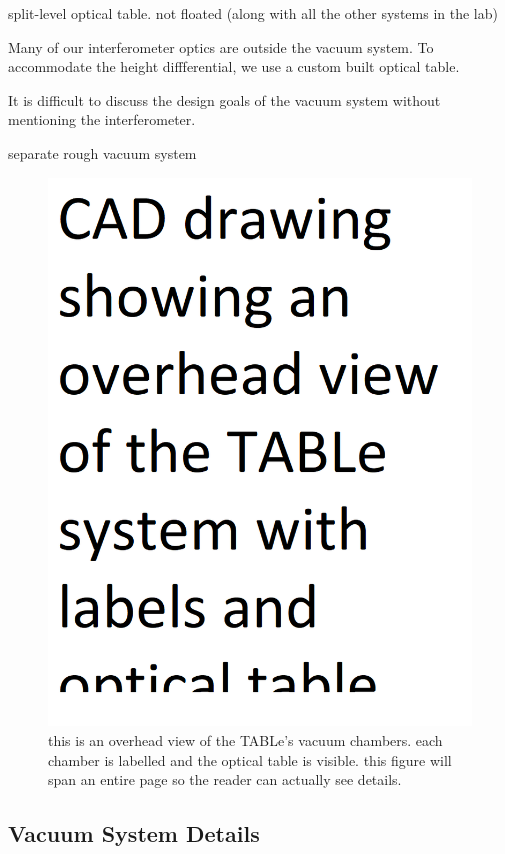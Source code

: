 split-level optical table. not floated (along with all the other systems in the lab)

Many of our interferometer optics are outside the vacuum system. To accommodate the height diffferential, we use a custom built optical table.

It is difficult to discuss the design goals of the vacuum system without mentioning the interferometer.


separate rough vacuum system 

\begin{figure}
	\centering
	\includegraphics[width=1.0\textwidth]{figures/chap2/TABLe_CAD_drawing.png}
	\caption{this is an overhead view of the TABLe's vacuum chambers. each chamber is labelled and the optical table is visible. this figure will span an entire page so the reader can actually see details.}
	\label{fig:AirAbs}
\end{figure}


\subsection{Vacuum System Details}

